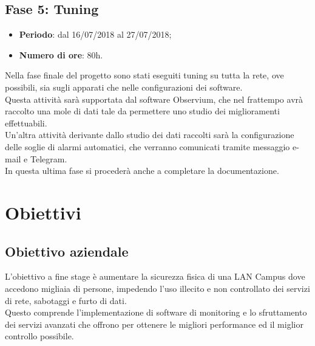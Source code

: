 \documentclass[Tesi.tex]{subfiles}
\begin{document}
\subsection{Fase 5: Tuning}
\begin{itemize}
	\item \textbf{Periodo}: dal 16/07/2018 al 27/07/2018;
	\item \textbf{Numero di ore}: 80h.
\end{itemize}
	
Nella fase finale del progetto sono stati eseguiti tuning su tutta la rete, ove possibili, sia sugli apparati che nelle configurazioni dei software. \\
Questa attività sarà supportata dal software Observium, che nel frattempo avrà raccolto una mole di dati tale da permettere uno studio dei miglioramenti effettuabili.\\
Un'altra attività derivante dallo studio dei dati raccolti sarà la configurazione delle soglie di alarmi automatici, che verranno comunicati tramite messaggio e-mail e Telegram. \\
In questa ultima fase si procederà anche a completare la documentazione. \\

\section{Obiettivi}
\subsection{Obiettivo aziendale}
L'obiettivo a fine stage è aumentare la sicurezza fisica di una LAN Campus dove accedono migliaia di
persone, impedendo l'uso illecito e non controllato dei servizi di rete, sabotaggi e furto di dati. \\
Questo comprende l'implementazione di software di monitoring e lo sfruttamento dei servizi avanzati che offrono per ottenere le migliori performance ed il miglior controllo possibile.
\end{document}
